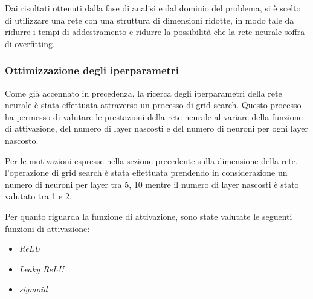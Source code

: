 Dai risultati ottenuti dalla fase di analisi e dal dominio del problema, si è
scelto di utilizzare una rete con una struttura di dimensioni ridotte, in modo
tale da ridurre i tempi di addestramento e ridurre la possibilità che la rete 
neurale soffra di overfitting.

\subsubsection{Ottimizzazione degli iperparametri}
Come già accennato in precedenza, la ricerca degli iperparametri della rete neurale
è stata effettuata attraverso un processo di grid search. Questo processo ha
permesso di valutare le prestazioni della rete neurale al variare della funzione
di attivazione, del numero di layer nascosti e del numero di neuroni per ogni
layer nascosto.

Per le motivazioni espresse nella sezione precedente sulla dimensione della rete, 
l'operazione di grid search è
stata effettuata prendendo in considerazione un numero di neuroni per layer
tra 5, 10 mentre il numero di layer nascosti è stato valutato tra 1 e 2.

Per quanto riguarda la funzione di attivazione, sono state valutate le seguenti
funzioni di attivazione:
\begin{itemize}
    \item \textit{ReLU}
    \item \textit{Leaky ReLU}
    \item \textit{sigmoid}
\end{itemize}

